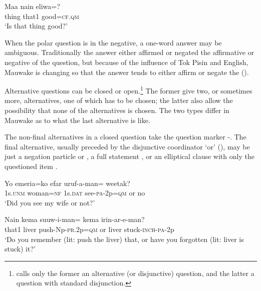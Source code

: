 \ea%
\label{ex:x1181}
\gll Maa  nain  eliwa=? \\
thing  that1  good=\textsc{cf}.\textsc{qm}      \\
\glt `Is that thing good?'
\z





When the polar question is in the negative, a one-word answer may be ambiguous. Traditionally the answer either affirmed or negated the affirmative or negative  of the question, but because of the influence of Tok Pisin and English, Mauwake is changing so that the answer tends to either affirm or negate the  ().

Alternative questions can be closed or open.\footnote{\citet{Haspelmath2007} calls only the former an alternative (or disjunctive) question, and the latter a question with standard disjunction.} The former give two, or sometimes more, alternatives, one of which has to be chosen; the latter also allow the possibility that none of the alternatives is chosen. The two types differ in Mauwake as to what the last alternative is like.

The non-final alternatives in a closed question take the question marker -. The final alternative, usually preceded by the disjunctive coordinator  `or' (), may be just a negation particle  or  , a full statement , or an elliptical clause with only the questioned item .

\ea%
\label{ex:x1182}
\gll Yo  emeria=ko  efar  uruf-a-man=    weetak? \\
1s.\textsc{unm}  woman=\textsc{nf}  1s.\textsc{dat}  see-\textsc{pa}-2p=\textsc{qm}  or  no      \\
\glt `Did you see my wife or not?'
\z





\ea%
\label{ex:x1183}
\gll Nain  kema  suuw-i-man=    kema  irin-ar-e-man? \\
that1  liver  push-Np-\textsc{pr}.2p=\textsc{qm}  or  liver  stuck-\textsc{inch}-\textsc{pa}-2p      \\
\glt `Do you remember (lit: push the liver) that, or have you forgotten (lit: liver is stuck) it?'
\z





